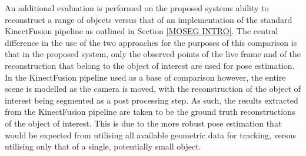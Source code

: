 An additional evaluation is performed on the proposed systems ability to reconstruct 
a range of objects versus that of an implementation of the standard KinectFusion 
pipeline as outlined in Section \ref{MOSEG INTRO}. The central difference in the use 
of the two approaches for the purposes of this comparison is that in the proposed system, 
only the observed points of the live frame and of the reconstruction that belong to the 
object of interest are used for pose estimation. In the KinectFusion pipeline used 
as a base of comparison however, the entire scene is modelled as the camera is moved, 
with the reconstruction of the object of interest being segmented as a post processing 
step. As such, the results extracted from the KinectFusion pipeline are taken to be the 
ground truth reconstructions of the object of interest. This is due to the more robust 
pose estimation that would be expected from utilising all available geometric data 
for tracking, versus utilising only that of a single, potentially small object.

